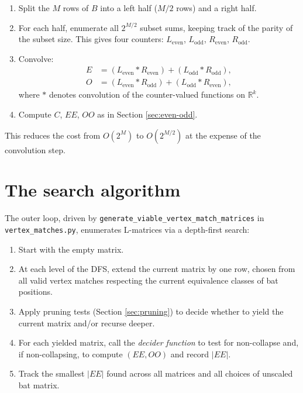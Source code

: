 \documentclass[12pt,a4paper]{article}
\begin{document}
\begin{enumerate}
  \item Split the $M$ rows of $B$ into a left half ($M/2$ rows) and a right
    half.
  \item For each half, enumerate all $2^{M/2}$ subset sums, keeping track of
    the parity of the subset size. This gives four counters: $L_{\text{even}}$,
    $L_{\text{odd}}$, $R_{\text{even}}$, $R_{\text{odd}}$.
  \item Convolve:
    \begin{align*}
      E &= (L_{\text{even}} * R_{\text{even}}) + (L_{\text{odd}} * R_{\text{odd}}),\\
      O &= (L_{\text{even}} * R_{\text{odd}}) + (L_{\text{odd}} * R_{\text{even}}),
    \end{align*}
    where $*$ denotes convolution of the counter-valued functions on
    $\mathbb{R}^k$.
  \item Compute $C$, $EE$, $OO$ as in Section \ref{sec:even-odd}.
\end{enumerate}

This reduces the cost from $O(2^M)$ to $O(2^{M/2})$ at the expense of the
convolution step.

\section{The search algorithm}
\label{sec:search}

The outer loop, driven by \texttt{generate\_viable\_vertex\_match\_matrices} in
\texttt{vertex\_matches.py}, enumerates L-matrices via a depth-first search:

\begin{enumerate}
  \item Start with the empty matrix.
  \item At each level of the DFS, extend the current matrix by one row, chosen
    from all valid vertex matches respecting the current equivalence classes of
    bat positions.
  \item Apply pruning tests (Section \ref{sec:pruning}) to decide whether to
    yield the current matrix and/or recurse deeper.
  \item For each yielded matrix, call the \emph{decider function} to test for
    non-collapse and, if non-collapsing, to compute $(EE, OO)$ and record
    $|EE|$.
  \item Track the smallest $|EE|$ found across all matrices and all choices of
    unscaled bat matrix.
\end{enumerate}
\end{document}
